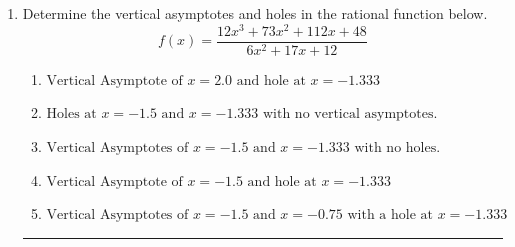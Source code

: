 \documentclass[14pt]{extbook}
\newcommand{\litem}[1]{\item#1\hspace*{-1cm}\rule{\textwidth}{0.4pt}}
\begin{document}
\begin{enumerate}
{\begin{enumerate}[label=\Alph*.]
\end{enumerate} }
\litem{
Determine the vertical asymptotes and holes in the rational function below.\[ f(x) = \frac{12x^{3} +73 x^{2} +112 x + 48}{6x^{2} +17 x + 12} \]\begin{enumerate}[label=\Alph*.]
\item \( \text{Vertical Asymptote of } x = 2.0 \text{ and hole at } x = -1.333 \)
\item \( \text{Holes at } x = -1.5 \text{ and } x = -1.333 \text{ with no vertical asymptotes.} \)
\item \( \text{Vertical Asymptotes of } x = -1.5 \text{ and } x = -1.333 \text{ with no holes.} \)
\item \( \text{Vertical Asymptote of } x = -1.5 \text{ and hole at } x = -1.333 \)
\item \( \text{Vertical Asymptotes of } x = -1.5 \text{ and } x = -0.75 \text{ with a hole at } x = -1.333 \)

\end{enumerate} }
\end{enumerate}
\end{document}
